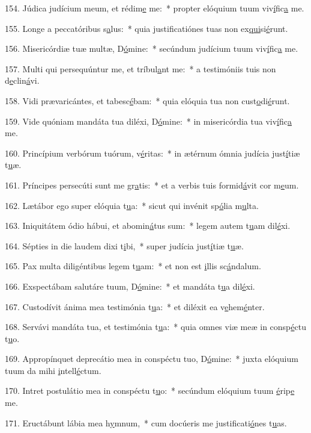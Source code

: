 154. Júdica judícium meum, et rédim\uline{e} me:~* propter elóquium tuum viv\uline{í}fic\uline{a} me.\par 
155. Longe a peccatóribus s\uline{a}lus:~* quia justificatiónes tuas non ex\uline{qui}si\uline{é}runt.\par 
156. Misericórdiæ tuæ multæ, D\uline{ó}mine:~* secúndum judícium tuum viv\uline{í}fic\uline{a} me.\par 
157. Multi qui persequúntur me, et tríbul\uline{a}nt me:~* a testimóniis tuis non d\uline{e}clin\uline{á}vi.\par 
158. Vidi prævaricántes, et tabesc\uline{é}bam:~* quia elóquia tua non cust\uline{o}di\uline{é}runt.\par 
159. Vide quóniam mandáta tua diléxi, D\uline{ó}mine:~* in misericórdia tua viv\uline{í}fic\uline{a} me.\par 
160. Princípium verbórum tuórum, v\uline{é}ritas:~* in ætérnum ómnia judícia just\uline{í}tiæ t\uline{u}æ.\par 
161. Príncipes persecúti sunt me gr\uline{a}tis:~* et a verbis tuis formid\uline{á}vit cor m\uline{e}um.\par 
162. Lætábor ego super elóquia t\uline{u}a:~* sicut qui invénit sp\uline{ó}lia m\uline{u}lta.\par 
163. Iniquitátem ódio hábui, et abomin\uline{á}tus sum:~* legem autem t\uline{u}am dil\uline{é}xi.\par 
164. Sépties in die laudem dixi t\uline{i}bi,~* super judícia just\uline{í}tiæ t\uline{u}æ.\par 
165. Pax multa diligéntibus legem t\uline{u}am:~* et non est \uline{i}llis sc\uline{á}ndalum.\par 
166. Exspectábam salutáre tuum, D\uline{ó}mine:~* et mandáta t\uline{u}a dil\uline{é}xi.\par 
167. Custodívit ánima mea testimónia t\uline{u}a:~* et diléxit ea v\uline{e}hem\uline{é}nter.\par 
168. Servávi mandáta tua, et testimónia t\uline{u}a:~* quia omnes viæ meæ in consp\uline{é}ctu t\uline{u}o.\par 
169. Appropínquet deprecátio mea in conspéctu tuo, D\uline{ó}mine:~* juxta elóquium tuum da mihi \uline{i}ntell\uline{é}ctum.\par 
170. Intret postulátio mea in conspéctu t\uline{u}o:~* secúndum elóquium tuum \uline{é}rip\uline{e} me.\par 
171. Eructábunt lábia mea h\uline{y}mnum,~* cum docúeris me justificati\uline{ó}nes t\uline{u}as.\par 
